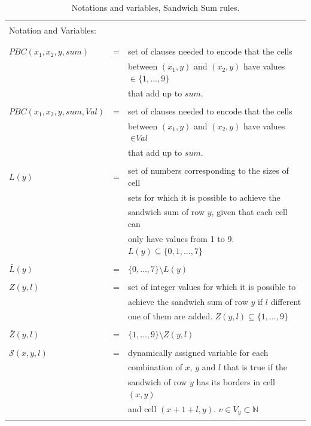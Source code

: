\begin{table}
    \centering
    \begin{tabular}{l c l}
    \hline
    \\
    Notation and Variables: &&\\
    \\
    \hline
    \\
    $PBC(x_1,x_2,y,sum)$    &= &set of clauses needed to encode that the cells\\
                            &  &between $(x_1,y)$ and $(x_2,y)$ have values $\in \{1,...,9\}$\\
                            &  & that add up to $sum$.\\
    \\
    $PBC(x_1,x_2,y,sum,Val)$&= &set of clauses needed to encode that the cells\\
                            &  &between $(x_1,y)$ and $(x_2,y)$ have values $\in \textit{Val}$\\
                            &  &that add up to $sum$.\\
    \\
    $L(y)$                  &= &set of numbers corresponding to the sizes of cell\\
                            &  &sets for which it is possible to achieve the\\
                            &  &sandwich sum of row $y$, given that each cell can\\
                            &  &only have values from 1 to 9. $L(y)\subseteq \{0,1,...,7\}$\\
    \\
    $\bar{L}(y)$            &= &$\{0,...,7\}\setminus L(y)$\\
    \\
    $Z(y,l)$                &= &set of integer values for which it is possible to\\
                            &  &achieve the sandwich sum of row $y$ if $l$ different\\
                            &  &one of them are added.  $Z(y,l)\subseteq \{1,...,9\}$\\
    \\
    $\bar{Z}(y,l)$          &= &$\{1,...,9\}\setminus Z(y,l)$\\
    \\
    $\mathcal{S}(x,y,l)$    &= &dynamically assigned variable for each\\
                            &  &combination of $x$, $y$ and $l$ that is true if the\\
                            &  &sandwich of row $y$ has its borders in cell $(x,y)$\\
                            &  &and cell $(x+1+l,y)$. $v \in V_y \subset \mathbb{N}$\\
    \\
    \hline
    \end{tabular}
    \caption{Notations and variables, Sandwich Sum rules.}
    \label{notation:SandwichSum}
\end{table}




